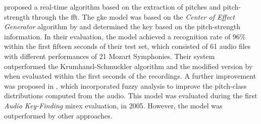 \textcite{chuan2005polyphonic} proposed a real-time
algorithm based on the extraction of pitches and
pitch-strength through the \acrfull{fft}. The \gls{gke}
model was based on the \emph{Center of Effect Generator}
algorithm by \textcite{chew2002spiral} and determined the
key based on the pitch-strength information. In their
evaluation, the model achieved a recognition rate of 96\%
within the first fifteen seconds of their test set, which
consisted of 61 audio files with different performances of
21 Mozart Symphonies. Their system outperformed the
Krumhansl-Schmuckler algorithm
\parencite{krumhansl1990cognitive} and the modified version
by \textcite{temperley1999whats} when evaluated within the
first seconds of the recordings. A further improvement was
proposed in \textcite{chuan2005fuzzy}, which incorporated
fuzzy analysis to improve the pitch-class distributions
computed from the audio. This model was evaluated during the
first \emph{Audio Key-Finding} \gls{mirex} evaluation, in
2005. However, the model was outperformed by other
approaches.



